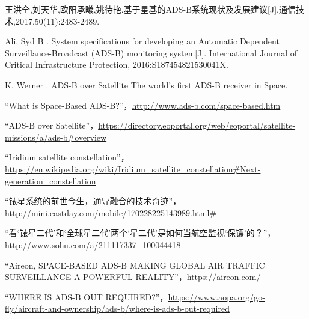 
\begin{thebibliography}{99}

王洪全,刘天华,欧阳承曦,姚待艳.基于星基的ADS-B系统现状及发展建议[J].通信技术,2017,50(11):2483-2489.




 Ali, Syd B . System specifications for developing an Automatic Dependent Surveillance-Broadcast (ADS-B) monitoring system[J]. International Journal of Critical Infrastructure Protection, 2016:S187454821530041X.

 K. Werner . ADS-B over Satellite The world’s first ADS-B receiver in Space.



“What is Space-Based ADS-B?”，\url{http://www.ads-b.com/space-based.htm}

“ADS-B over Satellite”，\url{https://directory.eoportal.org/web/eoportal/satellite-missions/a/ads-b#overview}

“Iridium satellite constellation”，\url{https://en.wikipedia.org/wiki/Iridium_satellite_constellation#Next-generation_constellation}

“铱星系统的前世今生，通导融合的技术奇迹”，\url{http://mini.eastday.com/mobile/170228225143989.html#}

“看‘铱星二代’和‘全球星二代’两个‘星二代’是如何当航空监视‘保镖’的？”，\url{http://www.sohu.com/a/211117337_100044418}

“Aireon, SPACE-BASED ADS-B MAKING GLOBAL AIR TRAFFIC SURVEILLANCE A POWERFUL REALITY”，\url{https://aireon.com/}

“WHERE IS ADS-B OUT REQUIRED?”，\url{https://www.aopa.org/go-fly/aircraft-and-ownership/ads-b/where-is-ads-b-out-required}

\end{thebibliography}